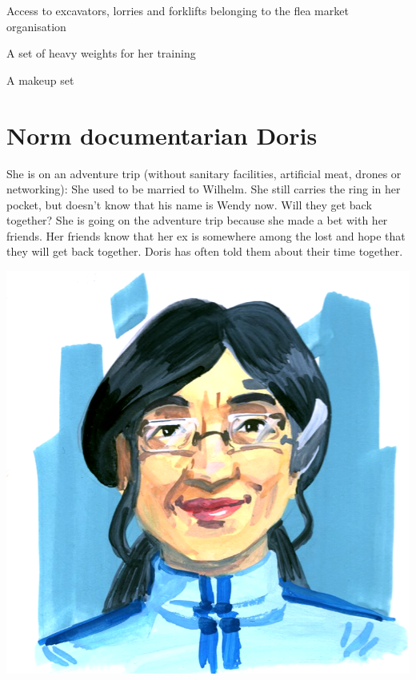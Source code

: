 \begin{npcBox}[title=Wendy]
    \begin{consequences}
    \item {}
    \item {}
    \item {}
    \end{consequences}

    \begin{equipment}
    \item Access to excavators, lorries and forklifts belonging to the flea market organisation
    \item A set of heavy weights for her training
    \item A makeup set
    \end{equipment}
\end{npcBox}
\newpage

\section{Norm documentarian Doris}

She is on an adventure trip (without sanitary facilities, artificial meat, drones or networking): She used to be married to Wilhelm. She still carries the ring in her pocket, but doesn't know that his name is Wendy now. Will they get back together?
She is going on the adventure trip because she made a bet with her friends. Her friends know that her ex is somewhere among the lost and hope that they will get back together. Doris has often told them about their time together.

\begin{center}
    \includegraphics[scale=0.4]{portraits/Flohmarkt_Doris.png}
\end{center}

